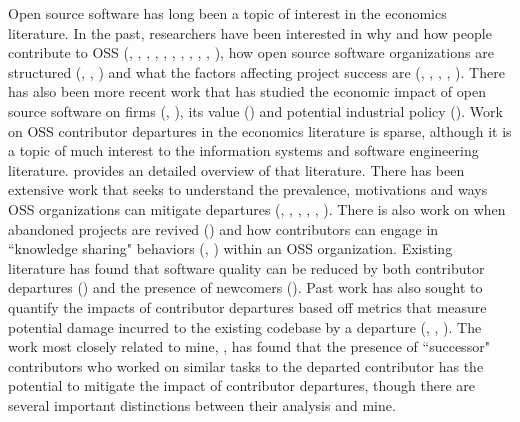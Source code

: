 \documentclass[12pt,notitlepage]{article}
\begin{document}
Open source software has long been a topic of interest in the economics literature. In the past, researchers have been interested in why and how people contribute to OSS (\cite{lerner_open_2001}, \cite{lerner_simple_2002}, \cite{hann_economic_2002}, \cite{lakhani_how_2003}, \cite{robert_g_wolf_why_2003}, 
\cite{hertel_motivation_2003}, \cite{krishnamurthy_intrinsic_2006}, \cite{chakravarty_link_2007}, \cite{xu_what_2020}, \cite{wang_monetary_2022}, \cite{conti_incentivizing_2023}), how open source software organizations are structured (\cite{mockus_two_2002}, \cite{crowston_coordination_2005}, \cite{den_besten_allocation_2008}) and what the factors affecting project success are (\cite{mustonen_copyleft--economics_2003}, \cite{fershtman_open_2007}, \cite{comino_planning_2007}, \cite{belenzon_motivation_2008}, \cite{giuri_skills_2010}). There has also been more recent work that has studied the economic impact of open source software on firms (\cite{nagle_open_2017}, \cite{nagle_learning_2018}), its value (\cite{hoffmann_value_2024}) and potential industrial policy (\cite{gortmaker_open_2025}). Work on OSS contributor departures in the economics literature is sparse, although it is a topic of much interest to the information systems and software engineering literature. \cite{rashid_systematic_2019} provides an detailed overview of that literature. There has been extensive work that seeks to understand the prevalence, motivations and ways OSS organizations can mitigate departures (\cite{robles_evolution_2005}, \cite{hannon_retaining_2008}, \cite{westlund_retaining_2008}, \cite{xu_volunteers_2010}, \cite{yu_empirical_2012}, \cite{miller_why_2019}). There is also work on when abandoned projects are revived (\cite{avelino_abandonment_2019}) and how contributors can engage in ``knowledge sharing" behaviors (\cite{von_krogh_community_2003}, \cite{rashid_exploring_2017}) within an OSS organization. Existing literature has found that software quality can be reduced by both contributor departures (\cite{mockus_organizational_2010}) and the presence of newcomers (\cite{foucault_impact_2015}). Past work has also sought to quantify the impacts of contributor departures based off metrics that measure potential damage incurred to the existing codebase by a departure (\cite{izquierdo-cortazar_using_2009}, \cite{rigby_quantifying_2016}, \cite{nassif_revisiting_2017}). The work most closely related to mine, \cite{rigby_quantifying_2016}, has found that the presence of ``successor" contributors who worked on similar tasks to the departed contributor has the potential to mitigate the impact of contributor departures, though there are several important distinctions between their analysis and mine. 
\end{document}

